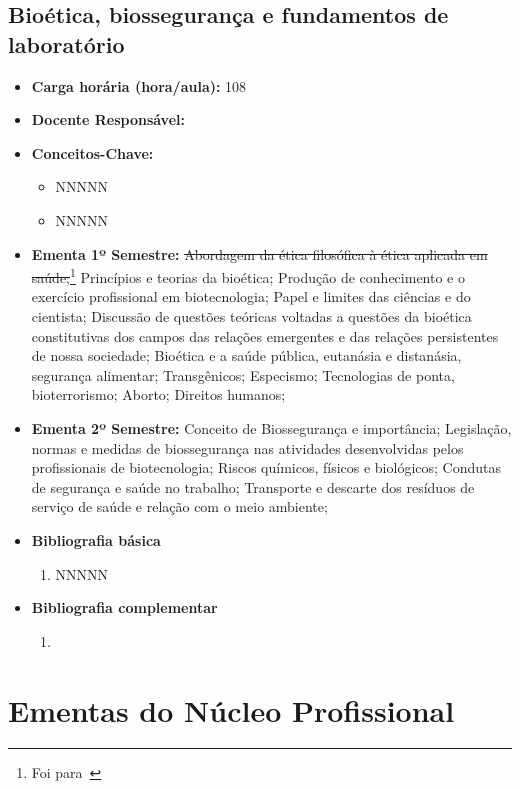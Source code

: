 \documentclass[11pt,fleqn]{book} %
\begin{document}
\subsection{Bioética, biossegurança e fundamentos de laboratório}\label{disc:bioeticalab}
\begin{itemize}
	\item \textbf{Carga horária (hora/aula):} 108
	\item \textbf{Docente Responsável:}
	\item \textbf{Conceitos-Chave:}
	\begin{itemize}
		\item NNNNN
		\item NNNNN
	\end{itemize}
	\item \textbf{Ementa 1º Semestre:} 
	\sout{Abordagem da ética filosófica à ética aplicada em saúde;}\footnote{Foi para~}
	Princípios e teorias da bioética;
	Produção de conhecimento e o exercício profissional em biotecnologia; 
	Papel e limites das ciências e do cientista; 
	Discussão de questões teóricas voltadas a questões da bioética constitutivas dos campos das relações emergentes e das relações persistentes de nossa sociedade; 
	Bioética e a saúde pública, eutanásia e distanásia, segurança alimentar; 
	Transgênicos; 
	Especismo; 
	Tecnologias de ponta, bioterrorismo; 
	Aborto;
	Direitos humanos;
	\item \textbf{Ementa 2º Semestre:} 
	Conceito de Biossegurança e importância; 
	Legislação, normas e medidas de biossegurança nas atividades desenvolvidas pelos profissionais de biotecnologia; 
	Riscos químicos, físicos e biológicos; 
	Condutas de segurança e saúde no trabalho; 
	Transporte e descarte dos resíduos de serviço de saúde e relação com o meio ambiente;
	\item \textbf{Bibliografia básica}
	\begin{enumerate}
		\item NNNNN
	\end{enumerate}
	\item \textbf{Bibliografia complementar}
	\begin{enumerate}
		\item 
	\end{enumerate}	
\end{itemize}


\newpage
\section{Ementas do Núcleo Profissional}\label{ementasTecnico}
\indent
\end{document}
